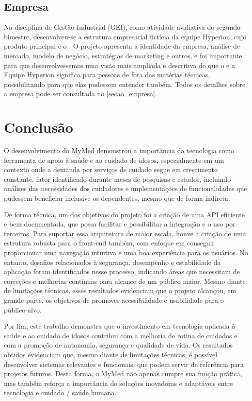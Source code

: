 \documentclass[
	article,			%
	12pt,				%
	oneside,			%
	a4paper,			%
    BIBLATEX,           %
	english,			%
	brazil,				%
	sumario=tradicional
	]{abntex2}
\begin{document}
\subsection{Empresa}
Na disciplina de Gestão Industrial (GEI), como atividade avaliativa do segundo bimestre, desenvolveu-se a estrutura empresarial fictícia da equipe Hyperion, cujo produto principal é o \nomeprojeto. O projeto apresenta a identidade da empresa, análise de mercado, modelo de negócio, estratégias de marketing e outros, e foi importante para que desenvolvessemos uma visão mais ampliada e descritiva do que o \nomeprojeto e a Equipe Hyperion significa para pessoas de fora das matérias técnicas, possibilitando para que elas pudessem entender também. Todos os detalhes sobre a empresa pode ser consultada no \autoref{secao_empresa}.

\section{Conclusão}
O desenvolvimento do MyMed demonstrou a importância da tecnologia como ferramenta de apoio à saúde e ao cuidado de idosos, especialmente em um contexto onde a demanda por serviços de cuidado segue em crescimento constante, fator identificado durante meses de pesquisas e estudos, incluindo análises das necessidades dos cuidadores e implementações de funcionalidades que pudessem beneficiar inclusive os dependentes, mesmo que de forma indireta.

De forma técnica, um dos objetivos do projeto foi a criação de uma API eficiente e bem documentada, que possa facilitar e possibilitar a integração e o uso por terceiros. Para suportar essa arquitetura de maior escala, houve a criação de uma estrutura robusta para o front-end também, com enfoque em conseguir proporcionar uma navegação intuitiva e uma boa experiência para os usuários. No entanto, desafios relacionados à segurança, desempenho e estabilidade da aplicação foram identificados nesse processo, indicando áreas que necessitam de correções e melhorias contínuas para alcance de um público maior. Mesmo diante de limitações técnicas, esses resultados evidenciam que o projeto alcançou, em grande parte, os objetivos de promover acessibilidade e usabilidade para o público-alvo.

Por fim, este trabalho demonstra que o investimento em tecnologia aplicada à saúde e ao cuidado de idosos contribui com a melhoria de rotina de cuidados e com a promoção de autonomia, segurança e qualidade de vida. Os resultados obtidos evidenciam que, mesmo diante de limitações técnicas, é possível desenvolver sistemas relevantes e funcionais, que podem servir de referência para projetos futuros. Desta forma, o MyMed não apenas cumpre sua função prática, mas também reforça a importância de soluções inovadoras e adaptáveis entre tecnologia e cuidado / saúde humana.
\end{document}
